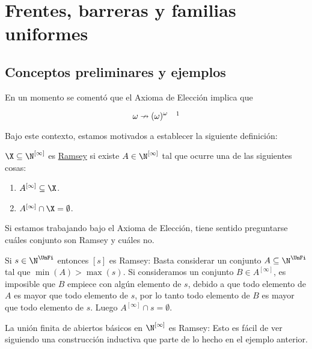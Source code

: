 \section{Frentes, barreras y familias uniformes}

\subsection{Conceptos preliminares y ejemplos}

En un momento se comentó que el Axioma de Elección implica que

\[
\omega \nrightarrow (\omega)^{\omega} \quad \footnotemark
\]

Bajo este contexto, estamos motivados a establecer la siguiente definición:

\begin{defn}
    $\X \subseteq \N^{[\infty]}$ es \ul{Ramsey} si existe $A \in \N^{[\infty]}$ tal que ocurre una de las siguientes cosas:
    
    \begin{enumerate}
        \item $A^{[\infty]} \subseteq \X$.
        \item $A^{[\infty]} \cap \X = \emptyset$.
    \end{enumerate}
\end{defn}

Si estamos trabajando bajo el Axioma de Elección, tiene sentido preguntarse cuáles conjunto son Ramsey y cuáles no.

\begin{ejem}
    Si $s \in \N^{\UnFi}$ entonces $[s]$ es Ramsey: Basta considerar un conjunto $A \subseteq \N^{\UnFi}$ tal que $\min(A) > \max(s)$. Si consideramos un conjunto $B \in A^{[\infty]}$, es imposible que $B$ empiece con algún elemento de $s$, debido a que todo elemento de $A$ es mayor que todo elemento de $s$, por lo tanto todo elemento de $B$ es mayor que todo elemento de $s$. Luego $A^{[\infty]} \cap s = \emptyset$.
\end{ejem}

\begin{ejem}
    La unión finita de abiertos básicos en $\N^{[\infty]}$ es Ramsey: Esto es fácil de ver siguiendo una construcción inductiva que parte de lo hecho en el ejemplo anterior.
\end{ejem}

